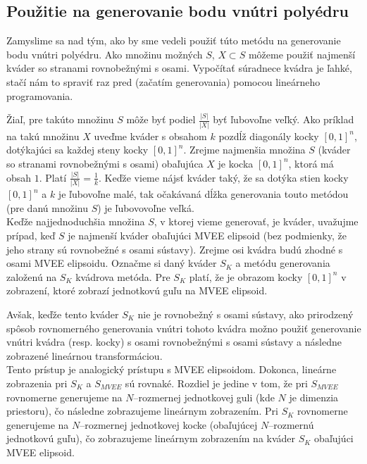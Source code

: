 \subsection{Použitie na generovanie bodu vnútri polyédru}

Zamyslime sa nad tým, ako by sme vedeli použiť túto metódu na generovanie bodu vnútri polyédru. Ako množinu možných $S$, $X \subset S$ môžeme použiť najmenší kváder so stranami rovnobežnými s osami. Vypočítať súradnece kvádra je ľahké, stačí nám to spraviť raz pred (začatím generovania) pomocou lineárneho programovania.

Žiaľ, pre takúto množinu $S$ môže byť podiel $\frac{|S|}{|X|}$ byť ľubovoľne veľký. Ako príklad na takú množinu $X$ uveďme kváder s obsahom $k$ pozdĺž diagonály kocky $[0,1]^n$, dotýkajúci sa každej steny kocky $[0,1]^n$. Zrejme najmenšia množina $S$ (kváder so stranami rovnobežnými s osami) obaľujúca $X$ je kocka $[0,1]^n$, ktorá má obsah $1$. Platí $\frac{|S|}{|X|}=\frac{1}{k}$. Keďže vieme nájsť kváder taký, že sa dotýka stien kocky $[0,1]^n$ a $k$ je ľubovoľne malé, tak očakávaná dĺžka generovania touto metódou (pre danú množinu $S$) je ľubovovoľne veľká.\\

Keďže najjednoduchšia množina $S$, v ktorej vieme generovať, je kváder, uvažujme prípad, keď $S$ je najmenší kváder obaľujúci MVEE elipsoid (bez podmienky, že jeho strany sú rovnobežné s osami sústavy). Zrejme osi kvádra budú zhodné s osami MVEE elipsoidu. Označme si daný kváder $S_K$ a metódu generovania založenú na $S_K$ kvádrova metóda. Pre $S_K$ platí, že je obrazom kocky $[0,1]^n$ v zobrazení, ktoré zobrazí jednotkovú guľu na MVEE elipsoid.

Avšak, keďže tento kváder $S_K$ nie je rovnobežný s osami sústavy, ako prirodzený spôsob rovnomerného generovania vnútri tohoto kvádra možno použiť generovanie vnútri kvádra (resp. kocky) s osami rovnobežnými s osami sústavy a následne zobrazené lineárnou transformáciou.\\

Tento prístup je analogický prístupu s MVEE elipsoidom. Dokonca, lineárne zobrazenia pri $S_K$ a $S_{MVEE}$ sú rovnaké. Rozdiel je jedine v tom, že pri $S_{MVEE}$ rovnomerne generujeme na $N$--rozmernej jednotkovej guli (kde $N$ je dimenzia priestoru), čo následne zobrazujeme lineárnym zobrazením. Pri $S_K$ rovnomerne generujeme na $N$--rozmernej jednotkovej kocke (obaľujúcej $N$--rozmernú jednotkovú guľu), čo zobrazujeme lineárnym zobrazením na kváder $S_K$ obaľujúci MVEE elipsoid.

